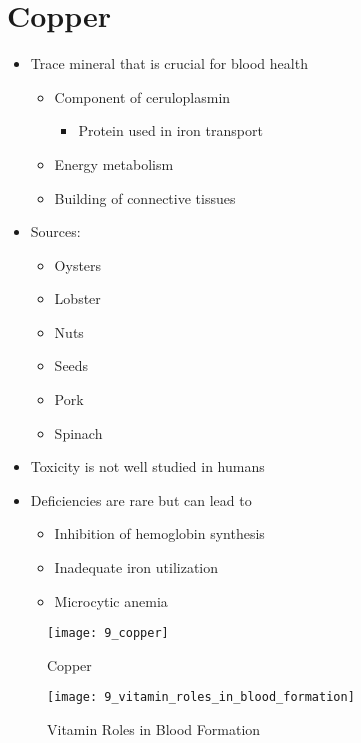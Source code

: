 \documentclass[title={Chapter 9}]{fdsn201notes}
\begin{document}
\section{Copper}\label{sec:Copper}
\begin{itemize}
	\item Trace mineral that is crucial for blood health
	\begin{itemize}
		\item Component of ceruloplasmin
		\begin{itemize}
			\item Protein used in iron transport
		\end{itemize}
		\item Energy metabolism
		\item Building of connective tissues
	\end{itemize}
	\item Sources:
	\begin{itemize}
		\item Oysters
		\item Lobster
		\item Nuts
		\item Seeds
		\item Pork
		\item Spinach
	\end{itemize}
	\item Toxicity is not well studied in humans
	\item Deficiencies are rare but can lead to
	\begin{itemize}
		\item Inhibition of hemoglobin synthesis
		\item Inadequate iron utilization
		\item Microcytic anemia
	\end{itemize}
\end{itemize}

\begin{figure}[H]
	\centering
	\texttt{[image: 9\_copper]}
	\caption{Copper}
	\label{fig:copper}
\end{figure}

\begin{figure}[H]
	\centering
	\texttt{[image: 9\_vitamin\_roles\_in\_blood\_formation]}
	\caption{Vitamin Roles in Blood Formation}
	\label{fig:vitamin-roles-in-blood-formation}
\end{figure}
\end{document}
